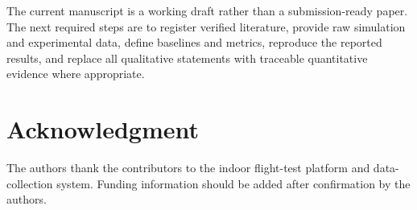 \documentclass[journal]{IEEEtran}
\begin{document}
The current manuscript is a working draft rather than a submission-ready paper. The next required steps are to register verified literature, provide raw simulation and experimental data, define baselines and metrics, reproduce the reported results, and replace all qualitative statements with traceable quantitative evidence where appropriate.

\section*{Acknowledgment}
The authors thank the contributors to the indoor flight-test platform and data-collection system. Funding information should be added after confirmation by the authors.



\end{document}
